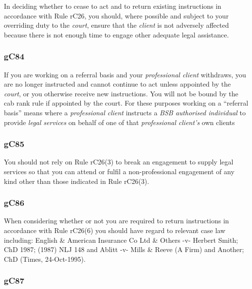 In deciding whether to cease to act and to return existing instructions
in accordance with Rule rC26, you should, where possible and subject to
your overriding duty to the \emph{court}, ensure that the \emph{client}
is not adversely affected because there is not enough time to engage
other adequate legal assistance.

\subsubsection{\color{darkgrey}gC84}

If you are working on a referral basis and your \emph{professional
client} withdraws, you are no longer instructed and cannot continue to
act unless appointed by the \emph{court}, or you otherwise receive new
instructions. You will not be bound by the cab rank rule if appointed by
the court. For these purposes working on a ``referral basis'' means
where a \emph{professional client} instructs a \emph{BSB authorised
individual} to provide \emph{legal services} on behalf of one of that
\emph{professional client's} own clients

\subsubsection{\color{darkgrey}gC85}

You should not rely on Rule rC26(3) to break an engagement to supply
legal services so that you can attend or fulfil a non-professional
engagement of any kind other than those indicated in Rule rC26(3).

\subsubsection{\color{darkgrey}gC86}

When considering whether or not you are required to return instructions
in accordance with Rule rC26(6) you should have regard to relevant case
law including: English \& American Insurance Co Ltd \& Others -v-
Herbert Smith; ChD 1987; (1987) NLJ 148 and Ablitt -v- Mills \& Reeve (A
Firm) and Another; ChD (Times, 24-Oct-1995).

\subsubsection{\color{darkgrey}gC87}

